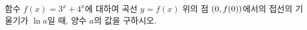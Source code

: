 함수 $f(x)=3^x+4^x$에 대하여 곡선 $y=f(x)$ 위의 점 $(0{,}\mkern3mu\mathopen{}f(0))$에서의 접선의 기울기가 $\ln a$일 때, 양수 $a$의 값을 구하시오.
